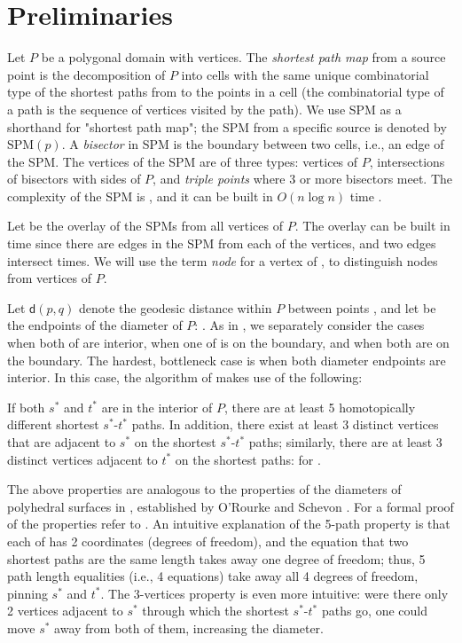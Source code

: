\documentclass{llncs}
\newcommand{\e}[1]{\emph{#1}}
\renewcommand\-{\textrm{-}}
\renewcommand{\O}[1]{\ensuremath{O(#1 \log n)}\xspace}
\renewcommand\P{\ensuremath{P}\xspace}
\renewcommand{\d}[2]{\ensuremath{\mathsf{d}(#1,#2)}\xspace}
\newcommand{\spm}[1]{\ensuremath{\textrm{SPM}(#1)}\xspace}
\renewcommand\ss{\ensuremath{s^*}\xspace}
\renewcommand\tt{\ensuremath{t^*}\xspace}
\newcommand\bae{\cite{bae}\xspace}
\begin{document}
\section{Preliminaries}

Let \P be a polygonal domain with  vertices. The \e{shortest path map} from a
source point  \cite{survey} is the decomposition of \P into cells with
the same unique
combinatorial type of the shortest paths from  to the points in a cell (the
combinatorial type of a path is the sequence of vertices visited by the path).
We use SPM as a shorthand for "shortest path map"; the SPM from a specific
source  is denoted by \spm{p}. A \e{bisector} in SPM is the boundary between
two cells, i.e., an edge of the SPM. The vertices of the SPM are of three types:
vertices of \P, intersections of bisectors with sides of \P, and \e{triple
points} where 3 or more bisectors meet. The complexity of the SPM is , and
it can be built in \O{n} time \cite{hs}.

Let  be the overlay of the SPMs from all vertices of \P. The overlay
can be built in  time since there are  edges in the SPM from each
of the  vertices, and two edges intersect  times. We will use the term
\e{node} for a vertex of , to distinguish nodes from vertices of \P.


Let \d{p}{q} denote the geodesic distance within \P between points , and
let  be the endpoints of the diameter of \P: . As in \bae, we separately consider the cases when both of 
are interior, when one of  is on the boundary, and when both are on the
boundary. The hardest, bottleneck case is when both diameter endpoints are
interior. In this case, the algorithm of \bae makes use of the following:
\begin{lemma}\label{lem5} \e{\bae}
If both \ss and \tt are in the interior of \P, there are at least 5
homotopically different shortest \ss-\tt paths. In addition, there exist at
least 3 distinct vertices  that are adjacent to \ss on the shortest
\ss-\tt paths; similarly, there are at least 3 distinct vertices 
adjacent to \tt on the shortest paths:  for .
\end{lemma}
The above properties are analogous to the properties of the diameters of
polyhedral surfaces in , established by O'Rourke and Schevon
\cite{orourke}. For a formal proof of the properties refer to \bae. An intuitive
explanation of the 5-path property is that each of  has 2 coordinates
(degrees of freedom), and the equation that two shortest paths are the same
length takes away one degree of freedom; thus, 5 path length equalities (i.e., 4
equations) take away all 4 degrees of freedom, pinning \ss and \tt. The
3-vertices property is even more intuitive: were there only 2 vertices adjacent
to \ss through which the shortest \ss-\tt paths go, one could move \ss away from
both of them, increasing the diameter.
\end{document}
